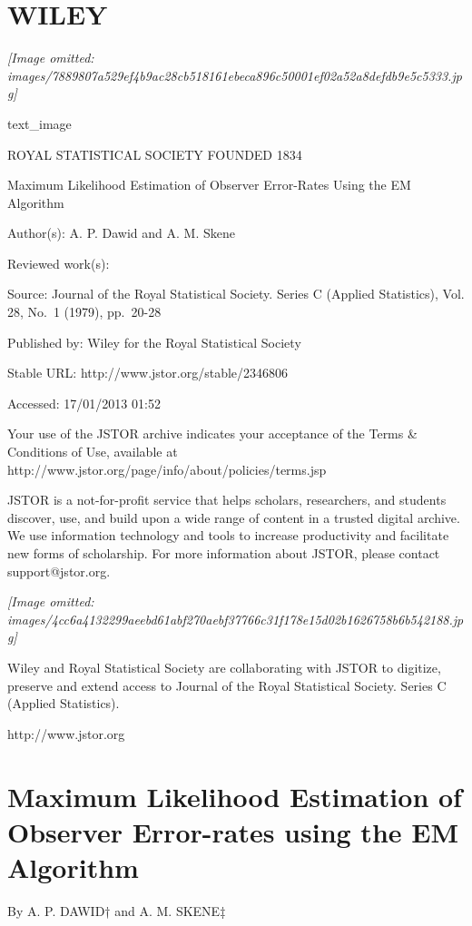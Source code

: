\documentclass[
]{article}
\author{}
\date{}
\begin{document}
\section{WILEY}\label{wiley}

\textit{[Image omitted: images/7889807a529ef4b9ac28cb518161ebeca896c50001ef02a52a8defdb9e5c5333.jpg]}

text\_image

ROYAL STATISTICAL SOCIETY FOUNDED 1834

Maximum Likelihood Estimation of Observer Error-Rates Using the EM
Algorithm

Author(s): A. P. Dawid and A. M. Skene

Reviewed work(s):

Source: Journal of the Royal Statistical Society. Series C (Applied
Statistics), Vol. 28, No.~1 (1979), pp.~20-28

Published by: Wiley for the Royal Statistical Society

Stable URL: http://www.jstor.org/stable/2346806

Accessed: 17/01/2013 01:52

Your use of the JSTOR archive indicates your acceptance of the Terms \&
Conditions of Use, available at
http://www.jstor.org/page/info/about/policies/terms.jsp

JSTOR is a not-for-profit service that helps scholars, researchers, and
students discover, use, and build upon a wide range of content in a
trusted digital archive. We use information technology and tools to
increase productivity and facilitate new forms of scholarship. For more
information about JSTOR, please contact support@jstor.org.

\textit{[Image omitted: images/4cc6a4132299aeebd61abf270aebf37766c31f178e15d02b1626758b6b542188.jpg]}

Wiley and Royal Statistical Society are collaborating with JSTOR to
digitize, preserve and extend access to Journal of the Royal Statistical
Society. Series C (Applied Statistics).

http://www.jstor.org

\section{Maximum Likelihood Estimation of Observer Error-rates using the
EM
Algorithm}\label{maximum-likelihood-estimation-of-observer-error-rates-using-the-em-algorithm}

By A. P. DAWID† and A. M. SKENE‡
\end{document}
